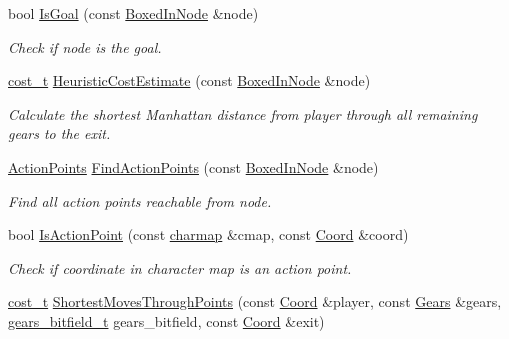 \begin{DoxyCompactItemize}
\item 
bool \hyperlink{namespaceboxedin_ada2dd541f6b68a4d95327e1250b65496}{Is\+Goal} (const \hyperlink{classboxedin_1_1BoxedInNode}{Boxed\+In\+Node} \&node)
\begin{DoxyCompactList}\small\item\em Check if node is the goal. \end{DoxyCompactList}\item 
\hyperlink{namespaceboxedin_ae2b1ff7be48e8d543a64922e65788e04}{cost\+\_\+t} \hyperlink{namespaceboxedin_a79fdbad685fb9625a322a3c349edbadd}{Heuristic\+Cost\+Estimate} (const \hyperlink{classboxedin_1_1BoxedInNode}{Boxed\+In\+Node} \&node)
\begin{DoxyCompactList}\small\item\em Calculate the shortest Manhattan distance from player through all remaining gears to the exit. \end{DoxyCompactList}\item 
\hyperlink{namespaceboxedin_ac5c79d0ac76a1a0ac73706f34abe3fc3}{Action\+Points} \hyperlink{namespaceboxedin_aa0ba22460d217870312025e1ee42767f}{Find\+Action\+Points} (const \hyperlink{classboxedin_1_1BoxedInNode}{Boxed\+In\+Node} \&node)
\begin{DoxyCompactList}\small\item\em Find all action points reachable from node. \end{DoxyCompactList}\item 
bool \hyperlink{namespaceboxedin_a515bb8e119ed8c9af726ebf4755e48ca}{Is\+Action\+Point} (const \hyperlink{namespaceboxedin_a95e88d677e0a17d3f9e4a9b0de980c4f}{charmap} \&cmap, const \hyperlink{namespaceboxedin_afc0dedc740afcefb60a4dac20d984b16}{Coord} \&coord)
\begin{DoxyCompactList}\small\item\em Check if coordinate in character map is an action point. \end{DoxyCompactList}\item 
\hyperlink{namespaceboxedin_ae2b1ff7be48e8d543a64922e65788e04}{cost\+\_\+t} \hyperlink{namespaceboxedin_a0ba0b3dc4e0327b472e477d1bc97add2}{Shortest\+Moves\+Through\+Points} (const \hyperlink{namespaceboxedin_afc0dedc740afcefb60a4dac20d984b16}{Coord} \&player, const \hyperlink{namespaceboxedin_a9fa1a20bcfcbdd4d7cad2d6fc92725f6}{Gears} \&gears, \hyperlink{namespaceboxedin_a06d85d1dad095f12bcc1a03894abb650}{gears\+\_\+bitfield\+\_\+t} gears\+\_\+bitfield, const \hyperlink{namespaceboxedin_afc0dedc740afcefb60a4dac20d984b16}{Coord} \&exit)
\item 

\end{DoxyCompactItemize}
